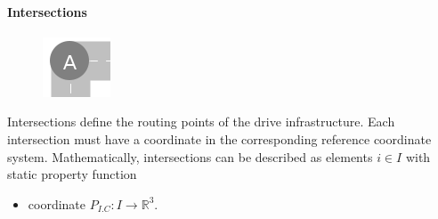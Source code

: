 \documentclass[graybox]{svmult}
\begin{document}
\paragraph{Intersections}
\begin{figure}
	\begin{center}
		\includegraphics[scale=0.5]{../../concepts/intersection.png}
	\end{center}
\end{figure}
Intersections define the routing points of the drive infrastructure.
Each intersection must have a coordinate in the corresponding reference coordinate system.
Mathematically, intersections can be described as elements $i \in I$ with static property function
\begin{itemize}
	\item coordinate $P_{I.C}: I \rightarrow \mathbb{R}^3$.
\end{itemize}

\end{document}
